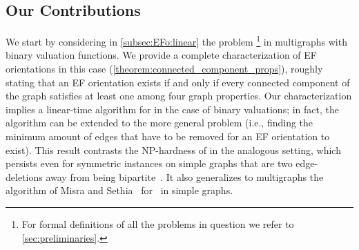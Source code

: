 


\subsection{Our Contributions}\label{sec:contributions}



We start by considering in \cref{subsec:EFo:linear} the {\EFo} problem%
\footnote{For formal definitions of all the problems in question we refer to \cref{sec:preliminaries}.} in multigraphs with binary valuation functions.
We provide a complete characterization of EF orientations in this case (\cref{theorem:connected_component_props}), roughly stating that an EF orientation exists if and only if every connected component of the graph satisfies at least one among four graph properties. Our characterization implies a linear-time algorithm for {\EFo} in the case of binary valuations; in fact, the algorithm can be extended to the more general {\EFmc} problem (i.e., finding the minimum amount of edges that have to be removed for an EF orientation to exist).
This result contrasts the NP-hardness of {\EFXo} in the analogous setting,
which persists even for symmetric instances on simple graphs that are two edge-deletions away from being bipartite~\cite{sagt/BlazejGRS25}. It also generalizes to multigraphs the algorithm of Misra and Sethia~\cite{aldt/MisraS24} for \EFo\ in simple graphs.

